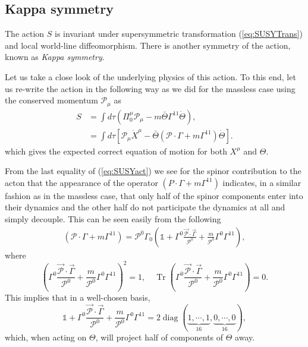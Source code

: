 \documentclass[graybox,envcountchap,sectrefs]{svmono}
\begin{document}
\subsection{Kappa symmetry}
The action $S$ is invariant under supersymmetric transformation (\ref{eq:SUSYTrans}) and local world-line diffeomorphism.
There is another symmetry of the action, known as \emph{Kappa symmetry}.


Let us take a close look of the underlying physics of this action. To this end, let us re-write the action in the following way as we did for the massless case using the conserved momentum $\mathcal{P}_{\mu}$
as
\begin{align} \label{eq:SUSYact}
S &=\int d \tau\left(\Pi_{0}^{\mu} \mathcal{P}_{\mu}-m \bar{\Theta} \Gamma^{11} \dot{\Theta}\right), \nonumber\\
&=\int d \tau\left[\mathcal{P}_{\mu} \dot{X}^{\mu}-\bar{\Theta}\left(\mathcal{P} \cdot \Gamma+m \Gamma^{11}\right) \dot{\Theta}\right].
\end{align}
which gives the expected correct equation of motion for both $X^{\mu}$ and $\Theta$.



From the last equality of (\ref{eq:SUSYact}) we see for the spinor contribution to the acton that the appearance of the operator $\left(P \cdot \Gamma+m \Gamma^{11}\right)$ indicates, in a similar fashion as in the massless case, that only half of the spinor components enter into their dynamics and the other half do not participate the dynamics at all and simply decouple. This can be seen easily from the following
\begin{align}
	\left(\mathcal{P} \cdot \Gamma+m \Gamma^{11}\right)=\mathcal{P}^{0} \Gamma_{0}(\mathds{1}+\Gamma^{0} \frac{\vec{\mathcal{P}} \cdot \vec{\Gamma}}{\mathcal{P}^{0}}+\frac{m}{\mathcal{P}^{0}} \Gamma^{0} \Gamma^{11}),
\end{align}
where
\begin{equation}
	\left(\Gamma^{0} \frac{\vec{\mathcal{P}} \cdot \vec{\Gamma}}{\mathcal{P}^{0}}+\frac{m}{\mathcal{P}^{0}} \Gamma^{0} \Gamma^{11}\right)^{2}=1, \quad \operatorname{Tr}\left(\Gamma^{0} \frac{\vec{\mathcal{P}} \cdot \vec{\Gamma}}{\mathcal{P}^{0}}+\frac{m}{\mathcal{P}^{0}} \Gamma^{0} \Gamma^{11}\right)=0.
\end{equation}
This implies that in a well-chosen basis,
\begin{equation}
	\mathds{1}+\Gamma^{0} \frac{\vec{\mathcal{P}} \cdot \vec{\Gamma}}{\mathcal{P}^{0}}+\frac{m}{\mathcal{P}^{0}} \Gamma^{0} \Gamma^{11}=2\operatorname{diag}(\underbrace{1,\cdots,1}_{16},\underbrace{0,\cdots,0}_{16}),
\end{equation}
which, when acting on $\Theta$, will project half of components of $\Theta$ away.
\end{document}
